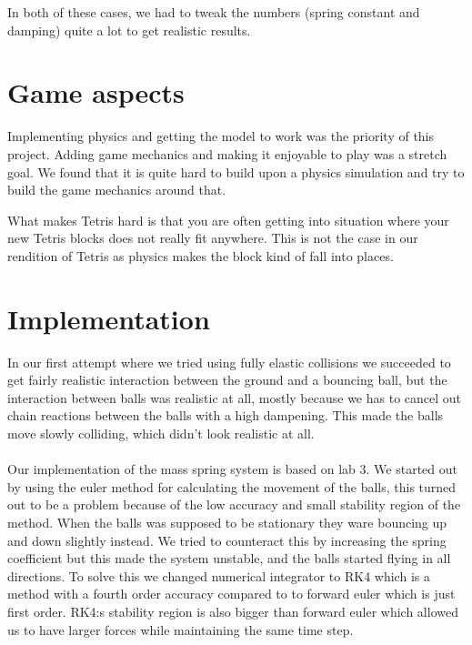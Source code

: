 \documentclass[11pt]{article} %
\begin{document}
In both of these cases, we had to tweak the numbers (spring constant and damping) quite a lot to get realistic results.

\section{Game aspects}
Implementing physics and getting the model to work was the priority of this project. Adding game mechanics and making it enjoyable to play was a stretch goal. We found that it is quite hard to build upon a physics simulation and try to build the game mechanics around that.

What makes Tetris hard is that you are often getting into situation where your new Tetris blocks does not really fit anywhere. This is not the case in our rendition of Tetris as physics makes the block kind of fall into places.

\section{Implementation}
In our first attempt where we tried using fully elastic collisions we succeeded to get fairly realistic interaction between the ground and a bouncing ball, but the interaction between balls was realistic at all, mostly because we has to cancel out chain reactions between the balls with a high dampening. This made the balls move slowly colliding, which didn't look realistic at all.
\\  \\
Our implementation of the mass spring system is based on lab 3. We started out by using the euler method for calculating the movement of the balls, this turned out to be a problem because of the low accuracy and small stability region of the method. When the balls was supposed to be stationary they ware bouncing up and down slightly instead. We tried to counteract this by increasing the spring coefficient but this made the system unstable, and the balls started flying in all directions. To solve this we changed numerical integrator to RK4 which is a method with a fourth order accuracy compared to to forward euler which is just first order. RK4:s stability region is also bigger than forward euler which allowed us to have larger forces while maintaining the same time step.
\end{document}
